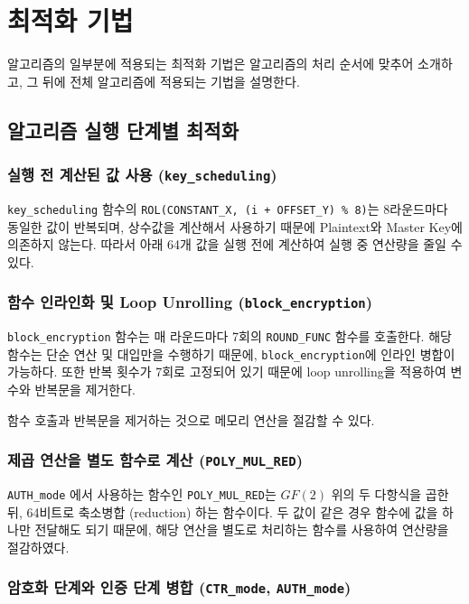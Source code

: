 \section{최적화 기법}

알고리즘의 일부분에 적용되는 최적화 기법은 알고리즘의 처리 순서에 맞추어 소개하고, 그 뒤에 전체 알고리즘에 적용되는 기법을 설명한다.

\subsection{알고리즘 실행 단계별 최적화}

\subsubsection{실행 전 계산된 값 사용 (\texttt{key_scheduling})}

\texttt{key_scheduling} 함수의 \texttt{ROL(CONSTANT\_X, (i + OFFSET\_Y) \% 8)}는 8라운드마다 동일한 값이 반복되며, 
상수값을 계산해서 사용하기 때문에 Plaintext와 Master Key에 의존하지 않는다. 
따라서 아래 64개 값을 실행 전에 계산하여 실행 중 연산량을 줄일 수 있다.

\subsubsection{함수 인라인화 및 Loop Unrolling (\texttt{block_encryption})}

\texttt{block_encryption} 함수는 매 라운드마다 7회의 \texttt{ROUND_FUNC} 함수를 호출한다. 
해당 함수는 단순 연산 및 대입만을 수행하기 때문에, \texttt{block_encryption}에 인라인 병합이 가능하다. 
또한 반복 횟수가 7회로 고정되어 있기 때문에 loop unrolling을 적용하여 변수와 반복문을 제거한다. 

함수 호출과 반복문을 제거하는 것으로 메모리 연산을 절감할 수 있다.

\subsubsection{제곱 연산을 별도 함수로 계산 (\texttt{POLY_MUL_RED})}

\texttt{AUTH_mode} 에서 사용하는 함수인 \texttt{POLY_MUL_RED}는 $GF(2)$ 위의 두 다항식을 곱한 뒤, 64비트로 축소병합 (reduction) 하는 함수이다. 
두 값이 같은 경우 함수에 값을 하나만 전달해도 되기 때문에, 해당 연산을 별도로 처리하는 함수를 사용하여 연산량을 절감하였다.

\subsubsection{암호화 단계와 인증 단계 병합 (\texttt{CTR_mode}, \texttt{AUTH_mode})}

